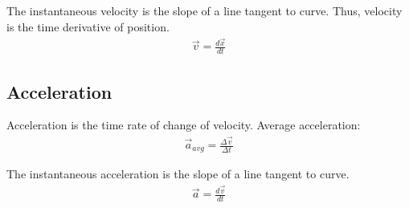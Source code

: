\documentclass{article}
\theoremstyle{mytheoremstyle}
\theoremstyle{mytheoremstyle}
\theoremstyle{myproblemstyle}
\begin{document}
    The instantaneous velocity is the slope of a line tangent to curve. Thus,
    velocity is the time derivative of position.
    \begin{align*}
        \vec{v}=\frac{d\vec{x}}{dt}
    \end{align*}

    \subsection*{Acceleration}
    Acceleration is the time rate of change of velocity. Average acceleration:
    \begin{align*}
        \vec{a}_{avg}=\frac{\Delta \vec{v}}{\Delta t}
    \end{align*}

    The instantaneous acceleration is the slope of a line tangent to curve.
    \begin{align*}
        \vec{a}=\frac{d\vec{v}}{dt}
    \end{align*}
\end{document}
